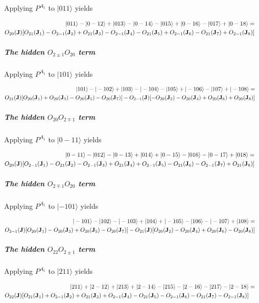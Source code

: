 Applying $P^{A_1}$ to $|011\rangle$ yields 

\begin{eqnarray}
|011\rangle-|0-12\rangle+|013\rangle-|0-14\rangle
-|015\rangle+|0-16\rangle-|017\rangle+|0-18\rangle =&&\\ \nonumber
O_{20}(\mathbf J)[
 O_{21}(\mathbf J_1)-O_{2-1}(\mathbf J_2)+O_{21}(\mathbf J_3)-O_{2-1}(\mathbf J_4)
-O_{21}(\mathbf J_5)+O_{2-1}(\mathbf J_6)-O_{21}(\mathbf J_7)+O_{2-1}(\mathbf J_8)
]&&
\end{eqnarray}

\subparagraph{The hidden $O_{2\pm1}O_{20}$ term}

Applying $P^{A_1}$ to $|101\rangle$ yields 

\begin{eqnarray}
 |101\rangle-|-102\rangle +|103\rangle-|-104\rangle 
-|105\rangle+|-106\rangle -|107\rangle+|-108\rangle 
=&&\\ \nonumber
O_{21}(\mathbf J)[O_{20}(\mathbf J_1)+O_{20}(\mathbf J_3)-O_{20}(\mathbf J_5)-O_{20}(\mathbf J_7)]-
O_{2-1}(\mathbf J)[-O_{20}(\mathbf J_2)-O_{20}(\mathbf J_4)+O_{20}(\mathbf J_6)+O_{20}(\mathbf J_8)]&&
\end{eqnarray}


\subparagraph{The hidden $O_{20}O_{2\mp1}$ term}

Applying $P^{A_1}$ to $|0-11\rangle$ yields 

\begin{eqnarray}
|0-11\rangle-|012\rangle-|0-13\rangle+|014\rangle
+|0-15\rangle-|016\rangle-|0-17\rangle+|018\rangle =&&\\ \nonumber
O_{20}(\mathbf J)[
 O_{2-1}(\mathbf J_1)-O_{21}(\mathbf J_2)-O_{2-1}(\mathbf J_3)+O_{21}(\mathbf J_4)
+O_{2-1}(\mathbf J_5)-O_{21}(\mathbf J_6)-O_{2-1}(\mathbf J_7)+O_{21}(\mathbf J_8)
]&&
\end{eqnarray}

\subparagraph{The hidden $O_{2\mp1}O_{20}$ term}

Applying $P^{A_1}$ to $|-101\rangle$ yields 

\begin{eqnarray}
 |-101\rangle-|102\rangle -|-103\rangle+|104\rangle 
+|-105\rangle-|106\rangle -|-107\rangle+|108\rangle 
=&&\\ \nonumber
O_{2-1}(\mathbf J)[O_{20}(\mathbf J_1)-O_{20}(\mathbf J_3)+O_{20}(\mathbf J_5)-O_{20}(\mathbf J_7)]-
O_{21}(\mathbf J) [O_{20}(\mathbf J_2)-O_{20}(\mathbf J_4)+O_{20}(\mathbf J_6)-O_{20}(\mathbf J_8)]&&
\end{eqnarray}



\subparagraph{The hidden $O_{22}O_{2\pm1}$ term}

Applying $P^{A_1}$ to $|211\rangle$ yields 

\begin{eqnarray}\label{nnn211}
|211\rangle+|2-12\rangle+|213\rangle+|2-14\rangle-
|215\rangle-|2-16\rangle-|217\rangle-|2-18\rangle&=& \\ \nonumber
O_{22}(\mathbf J)[O_{21}(\mathbf J_1)+O_{2-1}(\mathbf J_2)+O_{21}(\mathbf J_3)+O_{2-1}(\mathbf J_4)-
O_{21}(\mathbf J_5)-O_{2-1}(\mathbf J_6)-O_{21}(\mathbf J_7)-O_{2-1}(\mathbf J_8)]&&
\end{eqnarray}
   

